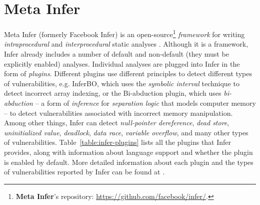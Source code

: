 \section{Meta Infer}
\label{infer}
Meta Infer \cite{infer-web} (formerly Facebook Infer) is an open-source\footnote{\textbf{Meta Infer}'s repository: \url{https://github.com/facebook/infer/}.} \textit{framework} for writing \textit{intraprocedural} and \textit{interprocedural} static analyses \cite{harmim-dip, marcin-bc, marek-bc}. Although it is a framework, Infer already includes a number of default and non-default (they must be explicitly enabled) analyses. Individual analyses are plugged into Infer in the form of \textit{plugins}. Different plugins use different principles to detect different types of vulnerabilities, e.g. InferBO, which uses the \textit{symbolic interval} technique \cite{InferBO} to detect incorrect array indexing, or the Bi-abduction plugin, which uses \textit{bi-abduction} \cite{SeparationLogic} -- a form of \textit{inference} for \textit{separation logic} that models computer memory -- to detect vulnerabilities associated with incorrect memory manipulation. Among other things, Infer can detect \textit{null-pointer dereference}, \textit{dead store}, \textit{uninitialized value}, \textit{deadlock}, \textit{data race}, \textit{variable overflow}, and many other types of vulnerabilities. Table~\ref{table:infer-plugins} lists all the plugins that Infer provides, along with information about language support and whether the plugin is enabled by default. More detailed information about each plugin and the types of vulnerabilities reported by Infer can be found at \cite{AllIssues}.

